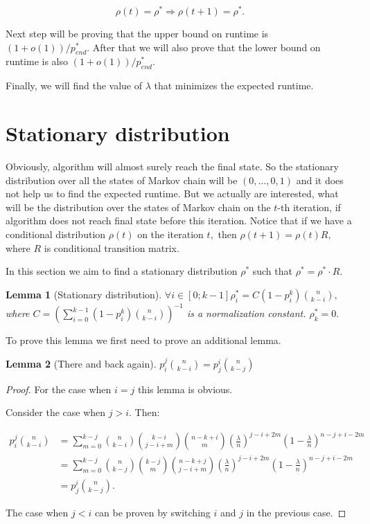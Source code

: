 \documentclass{article}
\newtheorem{lemma}{Lemma}
\begin{document}
$$\rho(t) = \rho^* \Rightarrow \rho(t + 1) = \rho^*.$$

Next step will be proving that the upper bound on runtime is $(1 + o(1)) / p_{end}^*.$ After that we will also prove that the lower bound on runtime is also $(1 + o(1)) / p_{end}^*.$

Finally, we will find the value of $\lambda$ that minimizes the expected runtime.

\section{Stationary distribution}

Obviously, algorithm will almost surely reach the final state. So the stationary distribution over all the states of Markov chain will be $(0, \dots, 0, 1)$ and it does not help us to find the expected runtime. But we actually are interested, what will be the distribution over the states of Markov chain on the $t$-th iteration, if algorithm does not reach final state before this iteration. Notice that if we have a conditional distribution $\rho(t)$ on the iteration $t,$ then $\rho(t + 1) = \rho(t) R,$ where $R$ is conditional transition matrix.

In this section we aim to find a stationary distribution $\rho^*$ such that $\rho^* = \rho^* \cdot R.$


\begin{lemma}[Stationary distribution]
$\forall i \in [0; k - 1] \rho_i^* = C (1 - p_i^k) \binom{n}{k - i},$ where $C = \left(\sum\limits_{i = 0}^{k - 1} (1 - p_i^k) \binom{n}{k - i}\right)^{-1}$ is a normalization constant. $\rho_k^* = 0.$
\end{lemma}

To prove this lemma we first need to prove an additional lemma.

\begin{lemma}[There and back again]
$p_i^j \binom{n}{k - i} = p_j^i \binom{n}{k - j}$
\end{lemma}

\begin{proof}
For the case when $i = j$ this lemma is obvious.

Consider the case when $j > i.$ Then:

\begin{align*}
  p_i^j \binom{n}{k - i} &= \sum\limits_{m = 0}^{k - j} \binom{n}{k - i} \binom{k - i}{j - i + m} \binom{n - k + i}{m} \left(\frac{\lambda}{n}\right)^{j - i + 2m} \left(1 - \frac{\lambda}{n}\right)^{n - j + i - 2m} \\
  &= \sum\limits_{m = 0}^{k - j} \binom{n}{k - j} \binom{k - j}{m} \binom{n - k + j}{j - i + m} \left(\frac{\lambda}{n}\right)^{j - i + 2m} \left(1 - \frac{\lambda}{n}\right)^{n - j + i - 2m} \\
  &= p_j^i \binom{n}{k - j}.
\end{align*}

The case when $j < i$ can be proven by switching $i$ and $j$ in the previous case.
\end{proof}
\end{document}
